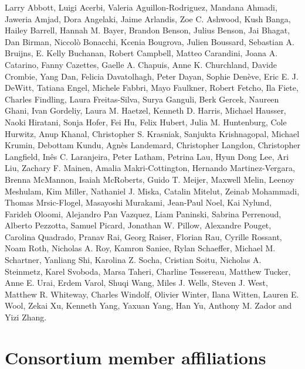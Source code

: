 \documentclass[10pt,lineno]{elife}
\begin{document}
Larry Abbott, Luigi Acerbi, Valeria Aguillon-Rodriguez, Mandana Ahmadi, Jaweria Amjad, Dora Angelaki, Jaime Arlandis, Zoe C. Ashwood, Kush Banga, Hailey Barrell, Hannah M. Bayer, Brandon Benson, Julius Benson, Jai Bhagat, Dan Birman, Niccolò Bonacchi, Kcenia Bougrova, Julien Boussard, Sebastian A. Bruijns, E. Kelly Buchanan, Robert Campbell, Matteo Carandini, Joana A. Catarino, Fanny Cazettes, Gaelle A. Chapuis, Anne K. Churchland, Davide Crombie, Yang Dan, Felicia Davatolhagh, Peter Dayan, Sophie Denève, Eric E. J. DeWitt, Tatiana Engel, Michele Fabbri, Mayo Faulkner, Robert Fetcho, Ila Fiete, Charles Findling, Laura Freitas-Silva, Surya Ganguli, Berk Gercek, Naureen Ghani, Ivan Gordeliy, Laura M. Haetzel, Kenneth D. Harris, Michael Hausser, Naoki Hiratani, Sonja Hofer, Fei Hu, Felix Hubert, Julia M. Huntenburg, Cole Hurwitz, Anup Khanal, Christopher S. Krasniak, Sanjukta Krishnagopal, Michael Krumin, Debottam Kundu, Agnès Landemard, Christopher Langdon, Christopher Langfield, Inês C. Laranjeira, Peter Latham, Petrina Lau, Hyun Dong Lee, Ari Liu, Zachary F. Mainen, Amalia Makri-Cottington, Hernando Martinez-Vergara, Brenna McMannon, Isaiah McRoberts, Guido T. Meijer, Maxwell Melin, Leenoy Meshulam, Kim Miller, Nathaniel J. Miska, Catalin Mitelut, Zeinab Mohammadi, Thomas Mrsic-Flogel, Masayoshi Murakami, Jean-Paul Noel, Kai Nylund, Farideh Oloomi, Alejandro Pan Vazquez, Liam Paninski, Sabrina Perrenoud, Alberto Pezzotta, Samuel Picard, Jonathan W. Pillow, Alexandre Pouget, Carolina Quadrado, Pranav Rai, Georg Raiser, Florian Rau, Cyrille Rossant, Noam Roth, Nicholas A. Roy, Kamron Saniee, Rylan Schaeffer, Michael M. Schartner, Yanliang Shi, Karolina Z. Socha, Cristian Soitu, Nicholas A. Steinmetz, Karel Svoboda, Marsa Taheri, Charline Tessereau, Matthew Tucker, Anne E. Urai, Erdem Varol, Shuqi Wang, Miles J. Wells, Steven J. West, Matthew R. Whiteway, Charles Windolf, Olivier Winter, Ilana Witten, Lauren E. Wool, Zekai Xu, Kenneth Yang, Yaxuan Yang, Han Yu, Anthony M. Zador and Yizi Zhang.

\section{Consortium member affiliations}
\end{document}
